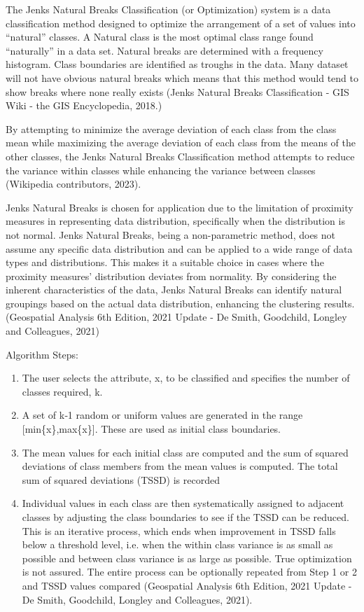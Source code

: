 \documentclass[11pt, a4paper]{article}
\begin{document}
The Jenks Natural Breaks Classification (or Optimization) system is a data classification method designed to optimize the arrangement of a set of values into ``natural'' classes. A Natural class is the most optimal class range found ``naturally'' in a data set. Natural breaks are determined with a frequency histogram. Class boundaries are identified as troughs in the data. Many dataset will not have obvious natural breaks which means that this method would tend to show breaks where none really exists (Jenks Natural Breaks Classification - GIS Wiki - the GIS Encyclopedia, 2018.)
\par
By attempting to minimize the average deviation of each class from the class mean while maximizing the average deviation of each class from the means of the other classes, the Jenks Natural Breaks Classification method attempts to reduce the variance within classes while enhancing the variance between classes (Wikipedia contributors, 2023).
\par
Jenks Natural Breaks is chosen for application due to the limitation of proximity measures in representing data distribution, specifically when the distribution is not normal. Jenks Natural Breaks, being a non-parametric method, does not assume any specific data distribution and can be applied to a wide range of data types and distributions. This makes it a suitable choice in cases where the proximity measures' distribution deviates from normality. By considering the inherent characteristics of the data, Jenks Natural Breaks can identify natural groupings based on the actual data distribution, enhancing the clustering results. (Geospatial Analysis 6th Edition, 2021 Update - De Smith, Goodchild, Longley and Colleagues, 2021)
\par
Algorithm Steps:
\begin{enumerate}
\item The user selects the attribute, x, to be classified and specifies the number of classes required, k.
\item A set of k‑1 random or uniform values are generated in the range [min\{x\},max\{x\}]. These are used as initial class boundaries. 
\item The mean values for each initial class are computed and the sum of squared deviations of class members from the mean values is computed. The total sum of squared deviations (TSSD) is recorded
\item Individual values in each class are then systematically assigned to adjacent classes by adjusting the class boundaries to see if the TSSD can be reduced. This is an iterative process, which ends when improvement in TSSD falls below a threshold level, i.e. when the within class variance is as small as possible and between class variance is as large as possible. True optimization is not assured. The entire process can be optionally repeated from Step 1 or 2 and TSSD values compared (Geospatial Analysis 6th Edition, 2021 Update - De Smith, Goodchild, Longley and Colleagues, 2021).
\end{enumerate}
\end{document}
